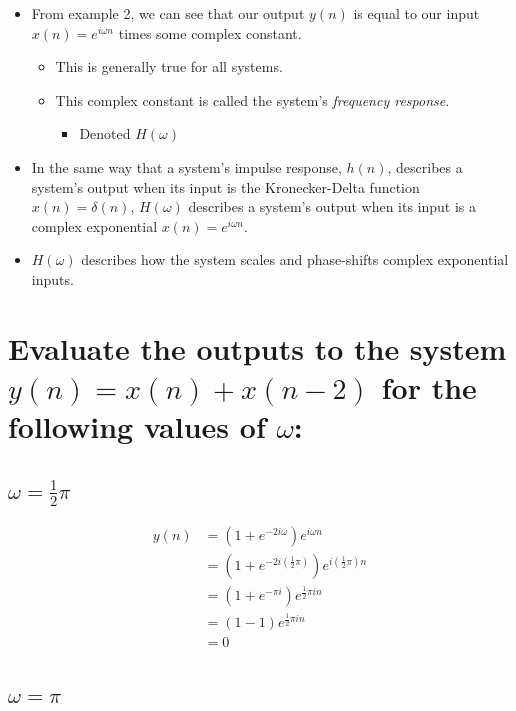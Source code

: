 \documentclass{article}
\renewcommand{\thesubsection}{\thesection.\alph{subsection}}
\begin{document}
\begin{itemize}
	\item From example 2, we can see that our output $y(n)$ is equal to our input $x(n) = e^{i{\omega}n}$ times some complex constant.
	\begin{itemize}
		\item This is generally true for all systems.
		\item This complex constant is called the system's \emph{frequency response}.
		\begin{itemize}
			\item Denoted $H(\omega)$
		\end{itemize}
	\end{itemize}
	\item In the same way that a system's impulse response, $h(n)$, describes a system's output when its input is the Kronecker-Delta function $x(n) = \delta(n)$, $H(\omega)$ describes a system's output when its input is a complex exponential $x(n) = e^{i{\omega}n}$.
		\item $H(\omega)$ describes how the system scales and phase-shifts complex exponential inputs.
\end{itemize}

\section[Example ~\thesection]{Evaluate the outputs to the system $y(n) = x(n) + x(n-2)$ for the following values of $\omega$:}

\subsection[~\thesubsection]{$\omega = \frac{1}{2}{\pi}$}

\begin{align*}
	y(n) &= (1 + e^{-2i{\omega}})e^{i{\omega}n} \\
	&= (1 + e^{-2i{(\frac{1}{2}\pi)}})e^{i{(\frac{1}{2}\pi)}n} \\
	&= (1 + e^{-{\pi}i})e^{\frac{1}{2}{\pi}in} \\
	&= (1 - 1)e^{\frac{1}{2}{\pi}in} \\
	&= 0
\end{align*}

\subsection[~\thesubsection]{$\omega = \pi$}
\end{document}

